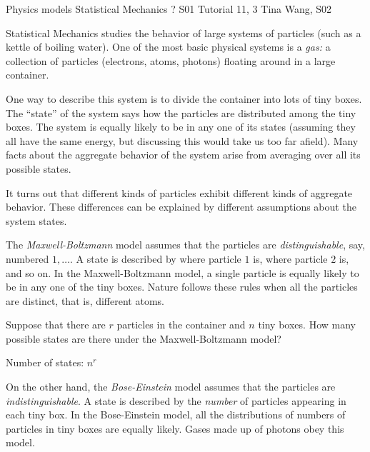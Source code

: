 \problemdata                                                             
        {Physics models} %
        {Statistical Mechanics} %
        {?} %
        {S01 Tutorial 11, 3} %
        {Tina Wang, S02} %
                                                                         
                                                                         
\begin{problem}           
Statistical Mechanics studies the behavior of large systems of
particles (such as a kettle of boiling water).  One of the most basic
physical systems is a {\em gas:} a collection of particles (electrons,
atoms, photons) floating around in a large container. 

One way to describe this system is to divide the container into lots
of tiny boxes.  The ``state'' of the system says how the particles are
distributed among the tiny boxes.  The system is equally likely to be
in any one of its states (assuming they all have the same energy, but
discussing this would take us too far afield).  Many facts about the
aggregate behavior of the system arise from averaging over all its
possible states.

It turns out that different kinds of particles exhibit different kinds
of aggregate behavior.  These differences can be explained by
different assumptions about the system states.

The {\em Maxwell-Boltzmann\/} model assumes that the particles are
{\em distinguishable}, say, numbered $1,\dots$.  A state is described
by where particle $1$ is, where particle $2$ is, and so on.  In the
Maxwell-Boltzmann model, a single particle is equally likely to be in
any one of the tiny boxes.  Nature follows these rules when all the
particles are distinct, that is, different atoms.

\begin{problemparts}

\problempart Suppose that there are $r$ particles in
the container and $n$ tiny boxes.  How many possible states are there
under the Maxwell-Boltzmann model?

\begin{solution}
Number of states: $n^r$
\end{solution}

On the other hand, the {\em Bose-Einstein\/} model assumes that the
particles are {\em indistinguishable\/}.  A state is described by the
{\em number\/} of particles appearing in each tiny box.  In the
Bose-Einstein model, all the distributions of numbers of particles in
tiny boxes are equally likely.  Gases made up of photons obey this
model.


\end{problemparts}
\end{problem}
